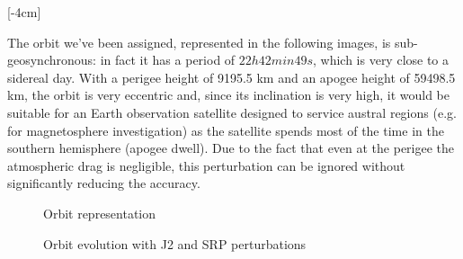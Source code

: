 \documentclass[11pt,a4paper]{report}
\begin{document}
\begin{table}[H]
\centering
{}
\caption{Mission requirements}
\label{tab:Mission_requirements}
\end{table}

[-4cm]

The orbit we've been assigned, represented in the following images, is sub-geosynchronous: in fact it has a period of $22h 42 min 49s$, which is very close to a sidereal day. With a perigee height of 9195.5 km and an apogee height of 59498.5 km, the orbit is very eccentric and, since its inclination is very high, it would be suitable for an Earth observation satellite designed to service austral regions (e.g. for magnetosphere investigation) as the satellite spends most of the time in the southern hemisphere (apogee dwell).  
Due to the fact that even at the perigee the atmospheric drag is negligible, this perturbation can be ignored without significantly reducing the accuracy.

\begin{figure}[H]
\centering
{}
\caption{Orbit representation}
\end{figure}

\begin{figure}[H]
\centering
{}
\caption{Orbit evolution with J2 and SRP perturbations}
\end{figure}
\end{document}
